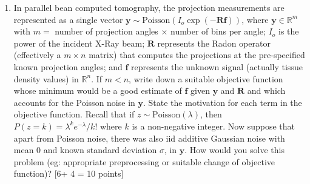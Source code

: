 \documentclass[11pt]{article}
\begin{document}
\begin{enumerate}
\begin{enumerate}
\end{enumerate}

\clearpage
\item In parallel bean computed tomography, the projection measurements are represented as a single vector $\boldsymbol{y} \sim \textrm{Poisson}(I_o \exp(-\boldsymbol{R f}))$, where $\boldsymbol{y} \in \mathbb{R}^m$ with $m = $ number of projection angles $\times$ number of bins per angle; $I_o$ is the power of the incident X-Ray beam; $\boldsymbol{R}$ represents the Radon operator (effectively a $m \times n$ matrix) that computes the projections at the pre-specified known projection angles; and $\boldsymbol{f}$ represents the unknown signal (actually tissue density values) in $\mathbb{R}^n$. If $m < n$, write down a suitable objective function whose minimum would be a good estimate of $\boldsymbol{f}$ given $\boldsymbol{y}$ and $\boldsymbol{R}$ and which accounts for the Poisson noise in $\boldsymbol{y}$. State the motivation for each term in the objective function. Recall that if $z \sim \textrm{Poisson}(\lambda)$, then $P(z = k) = \lambda^k e^{-\lambda} / k!$ where $k$ is a non-negative integer. Now suppose that apart from Poisson noise, there was also iid additive Gaussian noise with mean 0 and known standard deviation $\sigma$, in $\boldsymbol{y}$. How would you solve this problem (eg: appropriate preprocessing or suitable change of objective function)?
\textsf{[6+ 4 = 10 points]}


\end{enumerate}
\end{document}
